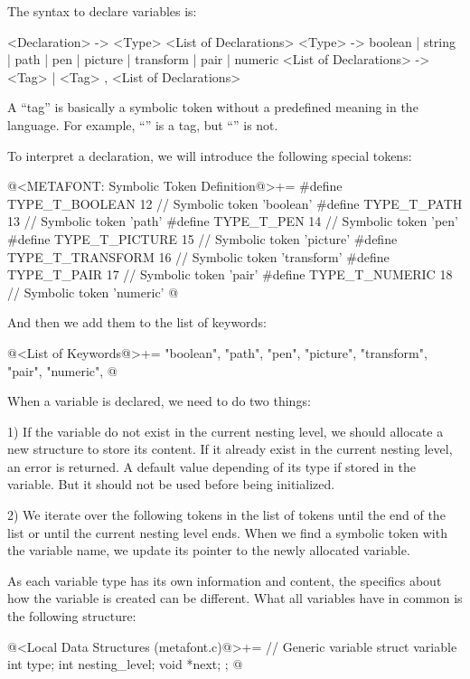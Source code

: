 
The syntax to declare variables is:

\alinhaverbatim
<Declaration> -> <Type> <List of Declarations>
<Type> -> boolean | string | path | pen | picture | transform | pair |
          numeric
<List of Declarations> -> <Tag> | <Tag> , <List of Declarations>
\alinhanormal

A ``tag'' is basically a symbolic token without a predefined meaning
in the language. For example, ``'' is a tag, but
``'' is not.

To interpret a declaration, we will introduce the following special
tokens:

\iniciocodigo
@<METAFONT: Symbolic Token Definition@>+=
#define TYPE_T_BOOLEAN               12 // Symbolic token 'boolean'
#define TYPE_T_PATH                  13 // Symbolic token 'path'
#define TYPE_T_PEN                   14 // Symbolic token 'pen'
#define TYPE_T_PICTURE               15 // Symbolic token 'picture'
#define TYPE_T_TRANSFORM             16 // Symbolic token 'transform'
#define TYPE_T_PAIR                  17 // Symbolic token 'pair'
#define TYPE_T_NUMERIC               18 // Symbolic token 'numeric'
@
\fimcodigo

And then we add them to the list of keywords:

\iniciocodigo
@<List of Keywords@>+=
"boolean", "path", "pen", "picture", "transform", "pair", "numeric",
@
\fimcodigo


When a variable is declared, we need to do two things:

1) If the variable do not exist in the current nesting level, we
should allocate a new structure to store its content. If it already
exist in the current nesting level, an error is returned. A default
value depending of its type if stored in the variable. But it should
not be used before being initialized.

2) We iterate over the following tokens in the list of tokens until
the end of the list or until the current nesting level ends. When we
find a symbolic token with the variable name, we update its pointer to
the newly allocated variable.


As each variable type has its own information and content, the
specifics about how the variable is created can be different. What all
variables have in common is the following structure:

\iniciocodigo
@<Local Data Structures (metafont.c)@>+=
// Generic variable
struct variable{
  int type;
  int nesting_level;
  void *next;
};
@
\fimcodigo

